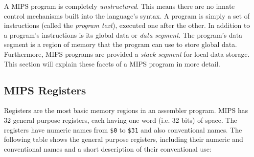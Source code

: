 \documentclass[12pt]{article}
\begin{document}
A MIPS program is completely \textit{unstructured}. This means there are no
     innate control mechanisms built into the language's syntax. A program is
     simply a set of instructions (called the \textit{program text}), executed
     one after the other. In addition to a program's instructions is its global
     data or \textit{data segment}. The program's data segment is a region of
     memory that the program can use to store global data. Furthermore, MIPS
     programs are provided a \textit{stack segment} for local data storage. This
     section will explain these facets of a MIPS program in more detail.\\

\subsection{MIPS Registers}

Registers are the most basic memory regions in an assembler program. MIPS has 32
     general purpose registers, each having one word (i.e. 32 bits) of
     space. The registers have numeric names from \texttt{\$0} to \texttt{\$31}
     and also conventional names. The following table shows the general purpose
     registers, including their numeric and conventional names and a short
     description of their conventional use:\\
\end{document}

